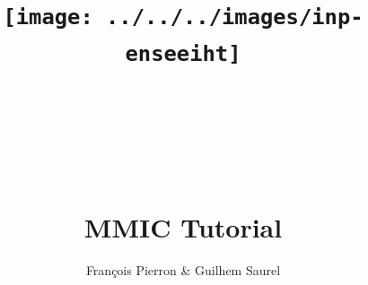 \documentclass{article}
\title{\texttt{[image: ../../../images/inp-enseeiht]} \\ ~ \\ ~ \\ ~ \\ ~ \\ MMIC Tutorial}
\author{François Pierron \& Guilhem Saurel}
\date{\oldstylenums{\today}}
\begin{document}
\begin{titlepage}
    \setcounter{page}{0}
    \maketitle
    \thispagestyle{empty}
    \tableofcontents
\end{titlepage}









\end{document}
